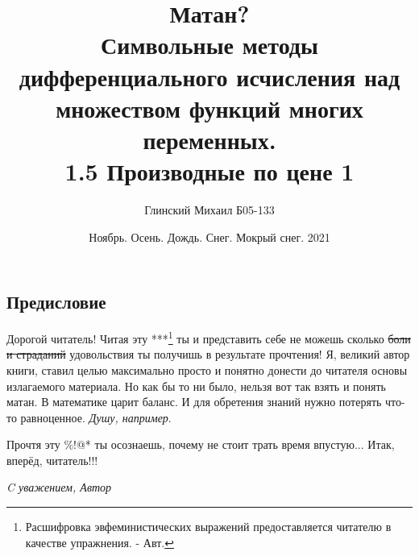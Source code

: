 \documentclass{report}
\title{\textbf{\Huge Матан?}\\ {\LARGE Символьные методы дифференциального исчисления над множеством функций многих переменных.}\\ {\small 1.5 Производные по цене 1}}
\author{Глинский Михаил Б05-133 }
\date{Ноябрь. Осень. Дождь. Снег. Мокрый снег. 2021}
\begin{document}
\maketitle
\vspace*{\fill}
\begin{center}
\section*{Предисловие}
\end{center}
\vspace*{\fill}
Дорогой читатель! Читая эту ***\footnote{Расшифровка эвфеминистических выражений предоставляется читателю в качестве упражнения. - Авт.} ты и представить себе не можешь сколько \sout{боли и страданий} удовольствия ты получишь в результате прочтения!
Я, великий автор книги, ставил целью максимально просто и понятно донести до читателя основы излагаемого материала.
Но как бы то ни было, нельзя вот так взять и понять матан. В математике царит баланс. И для обретения знаний нужно потерять что-то равноценное. \textit{Душу, например}.

Прочтя эту \%!@* ты осознаешь, почему не стоит трать время впустую... Итак, вперёд, читатель!!!

\begin{flushright}
\textit{C уважением, Автор}
\end{flushright}

\vspace*{\fill}
\tableofcontents
\end{document}
